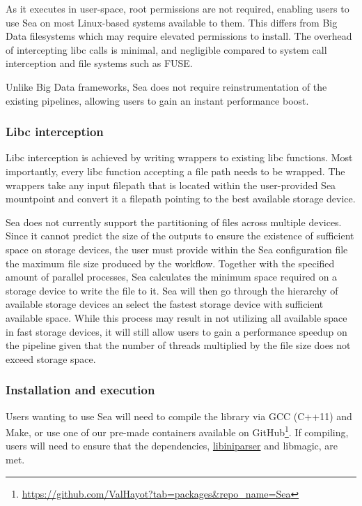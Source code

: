As it executes in user-space, root permissions are not required, enabling users
to use Sea on most Linux-based systems available to them. This differs from Big
Data filesystems which may require elevated permissions to install. The overhead
of intercepting libc calls is minimal, and negligible compared to system call
interception and file systems such as FUSE.

Unlike Big Data frameworks, Sea does not require reinstrumentation of the
existing pipelines, allowing users to gain an instant performance boost.

\subsubsection{Libc interception}

Libc interception is achieved by writing wrappers to existing libc functions.
Most importantly, every libc function accepting a file path needs to be wrapped.
The wrappers take any input filepath that is located within the
user-provided Sea mountpoint and convert it a filepath pointing to the best
available storage device.

Sea does not currently support the partitioning of files across multiple
devices. Since it cannot predict the size of the outputs to ensure the existence
of sufficient space on storage devices, the user must provide within the Sea
configuration file the maximum file size produced by the workflow. Together with
the specified amount of parallel processes, Sea calculates the minimum space
required on a storage device to write the file to it.
Sea will then go through the hierarchy of available storage devices an select
the fastest storage device with sufficient available space. While this process
may result in not utilizing all available space in fast storage devices, it will
still allow users to gain a performance speedup on the pipeline given that the
number of threads multiplied by the file size does not exceed storage space.

\subsubsection{Installation and execution}
Users wanting to use Sea will need to compile the library via GCC (C++11) and
Make, or use one of our pre-made containers available on
GitHub\footnote{\url{https://github.com/ValHayot?tab=packages&repo_name=Sea}}.
If compiling, users will need to ensure that the dependencies,
\href{https://github.com/ndevilla/iniparser}{libiniparser} and libmagic, are
met.

